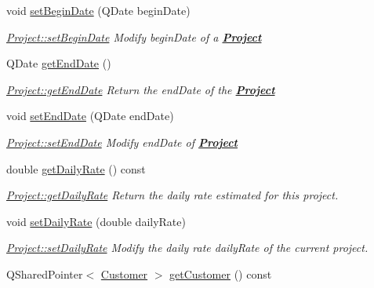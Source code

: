 \begin{DoxyCompactItemize}
void \hyperlink{classModels_1_1Project_a07dfb00cbec7442197a91bc0795ab14d}{set\+Begin\+Date} (Q\+Date begin\+Date)
\begin{DoxyCompactList}\small\item\em \hyperlink{classModels_1_1Project_a07dfb00cbec7442197a91bc0795ab14d}{Project\+::set\+Begin\+Date} Modify {\itshape begin\+Date} of a {\bfseries \hyperlink{classModels_1_1Project}{Project}} \end{DoxyCompactList}\item 
Q\+Date \hyperlink{classModels_1_1Project_ae925d3750ebce7b1b30c9dc7c08302b0}{get\+End\+Date} ()
\begin{DoxyCompactList}\small\item\em \hyperlink{classModels_1_1Project_ae925d3750ebce7b1b30c9dc7c08302b0}{Project\+::get\+End\+Date} Return the {\itshape end\+Date} of the {\bfseries \hyperlink{classModels_1_1Project}{Project}} \end{DoxyCompactList}\item 
void \hyperlink{classModels_1_1Project_a89e9603b862d0a282e4eb03e122e8c05}{set\+End\+Date} (Q\+Date end\+Date)
\begin{DoxyCompactList}\small\item\em \hyperlink{classModels_1_1Project_a89e9603b862d0a282e4eb03e122e8c05}{Project\+::set\+End\+Date} Modify {\itshape end\+Date} of {\bfseries \hyperlink{classModels_1_1Project}{Project}} \end{DoxyCompactList}\item 
double \hyperlink{classModels_1_1Project_a46d74a7452e712d223f1ca444a4cc180}{get\+Daily\+Rate} () const 
\begin{DoxyCompactList}\small\item\em \hyperlink{classModels_1_1Project_a46d74a7452e712d223f1ca444a4cc180}{Project\+::get\+Daily\+Rate} Return the daily rate estimated for this project. \end{DoxyCompactList}\item 
void \hyperlink{classModels_1_1Project_a9bc03d9632334a550bd25f6286d2c7a2}{set\+Daily\+Rate} (double daily\+Rate)
\begin{DoxyCompactList}\small\item\em \hyperlink{classModels_1_1Project_a9bc03d9632334a550bd25f6286d2c7a2}{Project\+::set\+Daily\+Rate} Modify the daily rate {\itshape daily\+Rate} of the current project. \end{DoxyCompactList}\item 
Q\+Shared\+Pointer$<$ \hyperlink{classModels_1_1Customer}{Customer} $>$ \hyperlink{classModels_1_1Project_ad15f442a24c9d42144b73f27a7afaa35}{get\+Customer} () const 

\end{DoxyCompactItemize}
